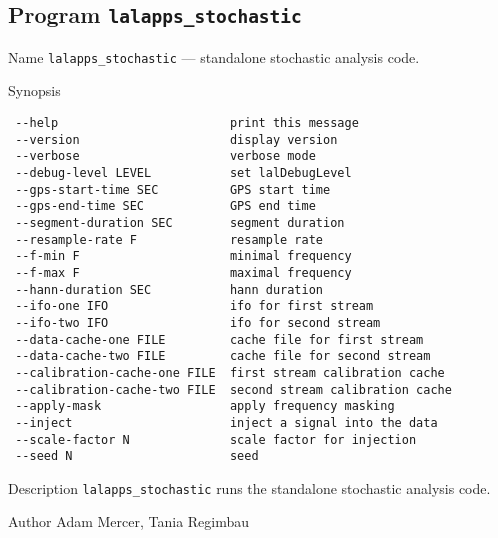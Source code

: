 \subsection{Program \texttt{lalapps\_stochastic}}
\label{program:lalapps-stochastic}

\begin{entry}
\item[Name]
\verb$lalapps_stochastic$ --- standalone stochastic analysis code.

\item[Synopsis]
\begin{verbatim}
 --help                        print this message
 --version                     display version
 --verbose                     verbose mode
 --debug-level LEVEL           set lalDebugLevel
 --gps-start-time SEC          GPS start time
 --gps-end-time SEC            GPS end time
 --segment-duration SEC        segment duration
 --resample-rate F             resample rate
 --f-min F                     minimal frequency
 --f-max F                     maximal frequency
 --hann-duration SEC           hann duration
 --ifo-one IFO                 ifo for first stream
 --ifo-two IFO                 ifo for second stream
 --data-cache-one FILE         cache file for first stream
 --data-cache-two FILE         cache file for second stream
 --calibration-cache-one FILE  first stream calibration cache
 --calibration-cache-two FILE  second stream calibration cache
 --apply-mask                  apply frequency masking
 --inject                      inject a signal into the data
 --scale-factor N              scale factor for injection
 --seed N                      seed
\end{verbatim}

\item[Description] \verb$lalapps_stochastic$ runs the standalone
stochastic analysis code.

\item[Author] 
Adam Mercer, Tania Regimbau
\end{entry}
